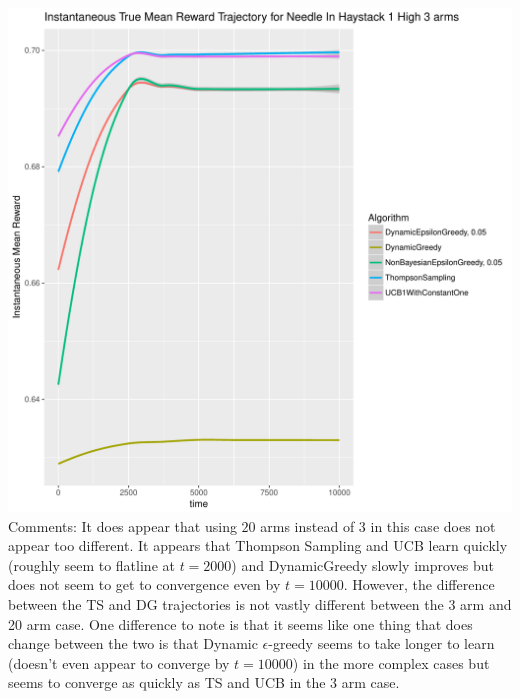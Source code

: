 \documentclass[11pt,letterpaper]{article}
\begin{document}
\includegraphics[scale=0.5]{"../results/preliminary_figures/Instantaneous True Mean Reward Trajectory for Needle In Haystack 1 High 3 arms"} \\

Comments: It does appear that using $20$ arms instead of $3$ in this case does not appear too different. It appears that Thompson Sampling and UCB learn quickly (roughly seem to flatline at $t = 2000$) and DynamicGreedy slowly improves but does not seem to get to convergence even by $t = 10000$. However, the difference between the TS and DG trajectories is not vastly different between the 3 arm and 20 arm case. One difference to note is that it seems like one thing that does change between the two is that Dynamic $\epsilon$-greedy seems to take longer to learn (doesn't even appear to converge by $t = 10000$) in the more complex cases but seems to converge as quickly as TS and UCB in the 3 arm case.
\end{document}
